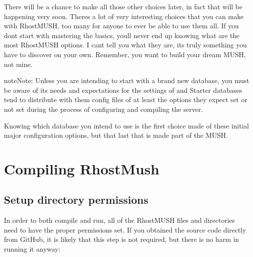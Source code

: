 \documentclass[letterpaper,10pt,english]{sphinxmanual}
\begin{document}
\sphinxAtStartPar
There will be a chance to make all those other choices later, in fact that
will be happening very soon. There\textquotesingle{}s a lot of very interesting choices that
you can make with RhostMUSH, too many for anyone to ever be able to use them
all. If you don\textquotesingle{}t start with mastering the basics, you\textquotesingle{}ll never end up knowing
what are the most RhostMUSH options. I can\textquotesingle{}t tell you what they are, it\textquotesingle{}s truly
something you have to discover on your own. Remember, you want to build your
dream MUSH, not mine.

\begin{sphinxadmonition}{note}{Note:}
\sphinxAtStartPar
Unless you are intending to start with a brand new database, you must be
aware of it\textquotesingle{}s needs and expectations for the settings of  and
 Starter databases tend to distribute with them config
files of at least the options they expect set or not set during the process
of configuring and compiling the server.

\sphinxAtStartPar
Knowing which database you intend to use is the first choice made of these
initial major configuration options, but that last that is made part of the
MUSH.
\end{sphinxadmonition}


\section{Compiling RhostMush}
\label{\detokenize{install:compiling-rhostmush}}\label{\detokenize{install:id6}}

\subsection{Setup directory permissions}
\label{\detokenize{install:setup-directory-permissions}}
\sphinxAtStartPar
In order to both compile and run, all of the RhostMUSH files and directories
need to have the proper permissions set. If you obtained the source code
directly from GitHub, it is likely that this step is not required, but there
is no harm in running it anyway:

\begin{sphinxVerbatim}[commandchars=\\\{\}]
\end{sphinxVerbatim}
\end{document}
